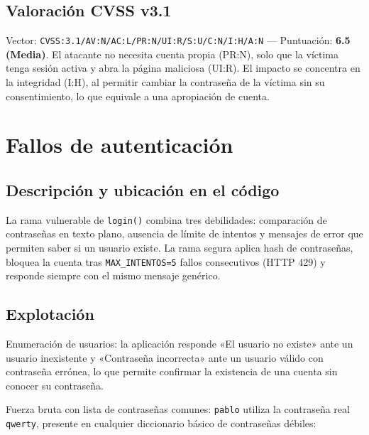 \subsection{Valoración CVSS v3.1}

Vector: \texttt{CVSS:3.1/AV:N/AC:L/PR:N/UI:R/S:U/C:N/I:H/A:N} — Puntuación:
\textbf{6.5 (Media)}. El atacante no necesita cuenta propia (PR:N), solo que
la víctima tenga sesión activa y abra la página maliciosa (UI:R). El impacto
se concentra en la integridad (I:H), al permitir cambiar la contraseña de la
víctima sin su consentimiento, lo que equivale a una apropiación de cuenta.

\section{Fallos de autenticación}
\label{sec:auth}

\subsection{Descripción y ubicación en el código}

La rama vulnerable de \verb|login()| combina tres debilidades: comparación
de contraseñas en texto plano, ausencia de límite de intentos y mensajes de
error que permiten saber si un usuario existe. La rama segura aplica
hash de contraseñas, bloquea la cuenta tras \verb|MAX_INTENTOS=5| fallos
consecutivos (HTTP 429) y responde siempre con el mismo mensaje genérico.

\subsection{Explotación}

Enumeración de usuarios: la aplicación responde «El usuario no existe» ante
un usuario inexistente y «Contraseña incorrecta» ante un usuario válido con
contraseña errónea, lo que permite confirmar la existencia de una cuenta sin
conocer su contraseña.

Fuerza bruta con lista de contraseñas comunes: \texttt{pablo} utiliza la
contraseña real \texttt{qwerty}, presente en cualquier diccionario básico de
contraseñas débiles:


